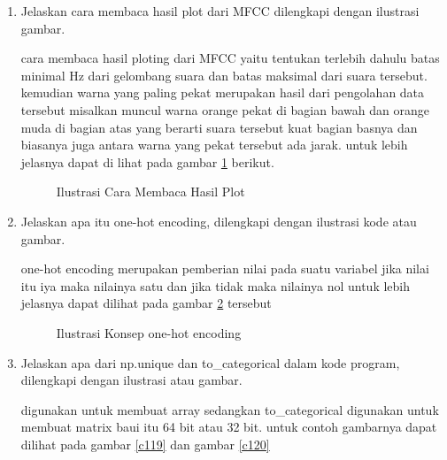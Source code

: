\begin{enumerate}
\item Jelaskan cara membaca hasil plot dari MFCC dilengkapi dengan ilustrasi gambar. \par
cara membaca hasil ploting dari MFCC yaitu tentukan terlebih dahulu batas minimal Hz dari gelombang suara dan batas maksimal dari suara tersebut. kemudian warna yang paling pekat merupakan hasil dari pengolahan data tersebut misalkan muncul warna orange pekat di bagian bawah dan orange muda di bagian atas yang berarti suara tersebut kuat bagian basnya dan biasanya juga antara warna yang pekat tersebut ada jarak. untuk lebih jelasnya dapat di lihat pada gambar \ref{c117} berikut.

\begin{figure}[!htbp]
      \caption{Ilustrasi Cara Membaca Hasil Plot}
      \label{c117}
      \end{figure}

\item Jelaskan apa itu one-hot encoding, dilengkapi dengan ilustrasi kode atau gambar.\par
one-hot encoding merupakan pemberian nilai pada suatu variabel jika nilai itu iya maka nilainya satu dan jika tidak maka nilainya nol untuk lebih jelasnya dapat dilihat pada gambar \ref{c118} tersebut

\begin{figure}[!htbp]
      \caption{Ilustrasi Konsep one-hot encoding}
      \label{c118}
      \end{figure}

\item Jelaskan apa dari np.unique dan to\_categorical dalam kode program, dilengkapi dengan ilustrasi atau gambar.\par
digunakan untuk membuat array sedangkan  to\_categorical digunakan untuk membuat matrix baui itu 64 bit atau 32 bit. untuk contoh gambarnya dapat dilihat pada gambar \ref{c119} dan gambar \ref{c120}


\end{enumerate}

